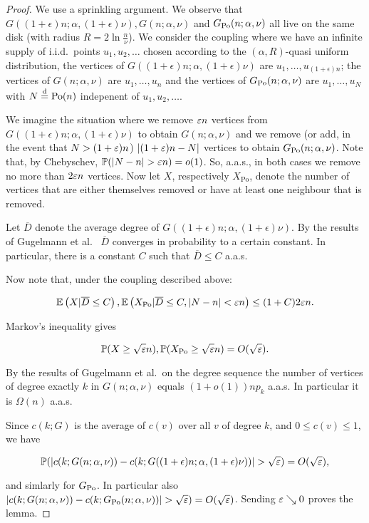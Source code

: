 \begin{proof}
We use a sprinkling argument. 
We observe that $G((1+\epsilon)n;\alpha,(1+\epsilon)\nu), G(n;\alpha,\nu)$ 
and $G_{\text{Po}}(n;\alpha,\nu)$ all live on the same disk (with radius $R = 2\ln \frac{n}{\nu}$).
We consider the coupling where we have an infinite supply of i.i.d.~points $u_1, u_2, \dots$ chosen according
to the $(\alpha,R)$-quasi uniform distribution, the vertices of $G((1+\epsilon)n;\alpha,(1+\epsilon)\nu)$
are $u_1,\dots, u_{(1+\epsilon)n}$; the vertices of $G(n;\alpha,\nu)$ are $u_1,\dots, u_n$ and 
the vertices of $G_{\text{Po}}(n;\alpha,\nu)$ are $u_1,\dots, u_N$ with $N\stackrel{\text{d}}{=} {\mathrm{Po}}(n)$ indepenent of
$u_1, u_2, \dots$.

We imagine the situation where we remove $\varepsilon n$ vertices from $G((1+\epsilon)n;\alpha,(1+\epsilon)\nu)$ to obtain
$G(n;\alpha,\nu)$ and we remove (or add, in the event that $N > (1+\varepsilon)n$) $|(1+\varepsilon)n - N|$ vertices to obtain $G_{\text{Po}}(n;\alpha,\nu)$.
Note that, by Chebyschev, $\mathbb{P}( |N-n| > \varepsilon n ) = o(1)$. So, a.a.s., in both cases we remove no more than $2\varepsilon n$ vertices.
Now let $X$, respectively $X_{\text{Po}}$, denote the number of vertices that are either themselves removed or have at least one 
neighbour that is removed.

Let $\overline{D}$ denote the average degree of $G((1+\epsilon)n;\alpha,(1+\epsilon)\nu)$.
By the results of Gugelmann et al.~\cite{gugelmann2012random} $\overline{D}$ converges in probability
to a certain constant. In particular, there is a constant $C$ such that $\overline{D} \leq C$ a.a.s.

Now note that, under the coupling described above:

$$ {\mathbb E}\left( X | \overline{D} \leq C \right),  {\mathbb E}\left( X_{\text{Po}} | \overline{D} \leq C, |N-n|<\varepsilon n \right) \leq (1+C)  2 \varepsilon n. $$ 

Markov's inequality gives

$$ \mathbb{P}( X \geq \sqrt{\varepsilon} n ), \mathbb{P}( X_{\text{Po}} \geq \sqrt{\varepsilon} n ) = O( \sqrt{\varepsilon} ). $$

By the results of Gugelmann et al.~on the degree sequence the number of vertices of degree exactly
$k$ in $G(n;\alpha,\nu)$ equals $(1+o(1)) n p_k$ a.a.s.
In particular it is $\Omega(n)$ a.a.s.

Since $c(k;G)$ is the average of $c(v)$ over all $v$ of degree $k$, and $0\leq c(v)\leq 1$, we have

$$ \mathbb{P}( |c(k;G(n;\alpha,\nu)) - c(k;G((1+\epsilon)n;\alpha,(1+\epsilon)\nu))| > \sqrt{\varepsilon} ) = O(\sqrt{\varepsilon}), $$

and simlarly for $G_{\text{Po}}$. In particular also 
$|c(k;G(n;\alpha,\nu)) - c(k;G_{\text{Po}}(n;\alpha,\nu))| > \sqrt{\varepsilon} ) = O(\sqrt{\varepsilon})$.
Sending $\varepsilon\searrow 0$ proves the lemma.
\end{proof}


